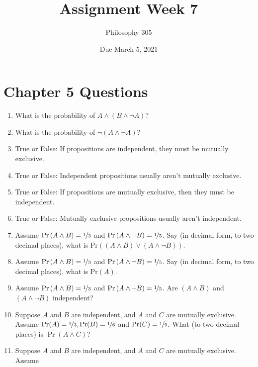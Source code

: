 \documentclass[
  11pt,
]{article}
\title{Assignment Week 7}
\author{Philosophy 305}
\date{Due March 5, 2021}
\providecommand{\tightlist}{%
  \setlength{\itemsep}{0pt}\setlength{\parskip}{0pt}}
\begin{document}
\maketitle

\hypertarget{chapter-5-questions}{%
\section{Chapter 5 Questions}\label{chapter-5-questions}}

\begin{enumerate}
\def\labelenumi{\arabic{enumi}.}
\tightlist
\item
  What is the probability of \(A\wedge\left(B\wedge\neg A\right)\)?
\item
  What is the probability of \(\neg\left(A\wedge\neg A\right)\)?
\item
  True or False: If propositions are independent, they must be mutually
  exclusive.
\item
  True or False: Independent propositions usually aren't mutually
  exclusive.
\item
  True or False: If propositions are mutually exclusive, then they must
  be independent.
\item
  True or False: Mutually exclusive propositions usually aren't
  independent.
\item
  Assume \(\text{Pr}\left(A\wedge B\right)=\nicefrac{1}{3}\) and
  \(\text{Pr}\left(A\wedge\neg B\right)=\nicefrac{1}{5}\). Say (in
  decimal form, to two decimal places), what is
  \(\text{Pr}\left(\left(A\wedge B\right)\vee\left(A\wedge\neg B\right)\right)\).
\item
  Assume \(\text{Pr}\left(A\wedge B\right)=\nicefrac{1}{3}\) and
  \(\text{Pr}\left(A\wedge\neg B\right)=\nicefrac{1}{5}\). Say (in
  decimal form, to two decimal places), what is
  \(\text{Pr}\left(A\right)\).
\item
  Assume \(\text{Pr}\left(A\wedge B\right)=\nicefrac{1}{3}\) and
  \(\text{Pr}\left(A\wedge\neg B\right)=\nicefrac{1}{5}\). Are
  \(\left(A\wedge B\right)\) and \(\left(A\wedge\neg B\right)\)
  independent?
\item
  Suppose \(A\) and \(B\) are independent, and \(A\) and \(C\) are
  mutually exclusive. Assume
  \(\Pr(A) = \nicefrac{1}{3}, \Pr(B) = \nicefrac{1}{6}\) and
  \(\Pr(C) = \nicefrac{1}{9}\). What (to two decimal places) is
  \(\Pr(A \wedge C)\)?
\item
  Suppose \(A\) and \(B\) are independent, and \(A\) and \(C\) are
  mutually exclusive. Assume

\end{enumerate}
\end{document}

